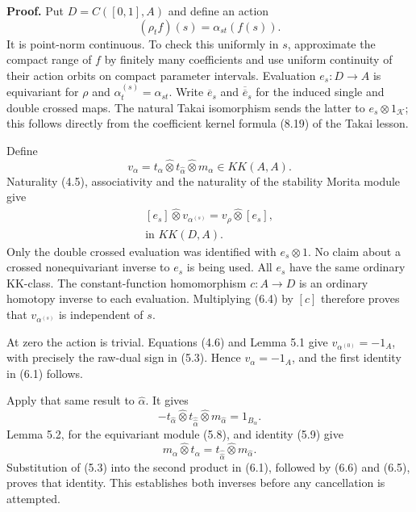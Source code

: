 \documentclass[
  11pt,
]{article}
\begin{document}
\textbf{Proof.} Put \(D=C([0,1],A)\) and define an action \[
(\rho_tf)(s)=\alpha_{st}(f(s)).
\tag{6.2}
\] It is point-norm continuous. To check this uniformly in \(s\),
approximate the compact range of \(f\) by finitely many coefficients and
use uniform continuity of their action orbits on compact parameter
intervals. Evaluation \(e_s:D\to A\) is equivariant for \(\rho\) and
\(\alpha^{(s)}_t=\alpha_{st}\). Write \(\overline e_s\) and
\(\overline{\overline e}_s\) for the induced single and double crossed
maps. The natural Takai isomorphism sends the latter to
\(e_s\otimes1_{\mathcal K}\); this follows directly from the coefficient
kernel formula (8.19) of the Takai lesson.

Define \[
v_\alpha=t_\alpha\widehat\otimes t_{\widehat\alpha}
                         \widehat\otimes m_\alpha
 \in KK(A,A).
\tag{6.3}
\] Naturality (4.5), associativity and the naturality of the stability
Morita module give \[
\begin{gathered}
{}[e_s]\widehat\otimes v_{\alpha^{(s)}}
 =v_\rho\widehat\otimes[e_s],\\
\text{in }KK(D,A).
\end{gathered}
\tag{6.4}
\] Only the double crossed evaluation was identified with
\(e_s\otimes1\). No claim about a crossed nonequivariant inverse to
\(e_s\) is being used. All \(e_s\) have the same ordinary KK-class. The
constant-function homomorphism \(c:A\to D\) is an ordinary homotopy
inverse to each evaluation. Multiplying (6.4) by \([c]\) therefore
proves that \(v_{\alpha^{(s)}}\) is independent of \(s\).

At zero the action is trivial. Equations (4.6) and Lemma 5.1 give
\(v_{\alpha^{(0)}}=-1_A\), with precisely the raw-dual sign in (5.3).
Hence \(v_\alpha=-1_A\), and the first identity in (6.1) follows.

Apply that same result to \(\widehat\alpha\). It gives \[
-t_{\widehat\alpha}\widehat\otimes t_{\widehat{\widehat\alpha}}
                \widehat\otimes m_{\widehat\alpha}=1_{B_\alpha}.
\tag{6.5}
\] Lemma 5.2, for the equivariant module (5.8), and identity (5.9) give
\[
m_\alpha\widehat\otimes t_\alpha
 =t_{\widehat{\widehat\alpha}}
                  \widehat\otimes m_{\widehat\alpha}.
\tag{6.6}
\] Substitution of (5.3) into the second product in (6.1), followed by
(6.6) and (6.5), proves that identity. This establishes both inverses
before any cancellation is attempted.
\end{document}
